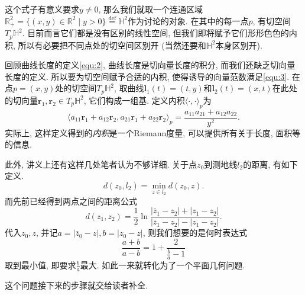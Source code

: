 \documentclass[./main.tex]{subfiles}
\begin{document}
这个式子有意义要求\(y\ne0\), 那么我们就取一个连通区域\(\mathbb{R}^2_+=\{(x,y)\in\mathbb{R}^2\mid y>0\}\overset{\text{def}}{=}\mathbb{H}^2\)作为讨论的对象. 在其中的每一点\(p\), 有切空间\(T_p\mathbb{H}^2\). 目前而言它们都是没有区别的线性空间, 但我们即将赋予它们形形色色的内积, 所以有必要把不同点处的切空间区别开 (当然还要和\(\mathbb{H}^2\)本身区别开).

回顾曲线长度的定义\eqref{equ:2}, 曲线长度是切向量长度的积分, 而我们还缺乏切向量长度的定义. 所以要为切空间赋予合适的内积, 使得诱导的向量范数满足\eqref{equ:3}. 在点\(p=(x,y)\)处的切空间\(T_p\mathbb{H}^2\), 取曲线\(\mathbf{l}_1(t)=(t,y)\)和\(\mathbf{l}_2(t)=(x,t)\)在此处的切向量\(\mathbf{r}_1,\mathbf{r}_2\in T_p\mathbb{H}^2\), 它们构成一组基. 定义内积\(\langle\cdot,\cdot\rangle_p\)为
\[
    \langle a_{11}\mathbf{r}_1+a_{12}\mathbf{r}_2,a_{21}\mathbf{r}_1+a_{22}\mathbf{r}_2\rangle_p=\frac{a_{11}a_{21}+a_{12}a_{22}}{y^2}.
\]
实际上, 这样定义得到的\textit{内积}是一个Riemann度量, 可以提供所有关于长度, 面积等的信息.

此外, 讲义上还有这样几处笔者认为不够详细. 关于点\(z_0\)到测地线\(l_2\)的距离, 有如下定义.
\[
    d(z_0,l_2)=\min_{z\in l_2}d(z_0,z).
\]
而先前已经得到两点之间的距离公式
\[
    d(z_1,z_2)=\frac{1}{2}\ln \frac{|\bar z_1-z_2|+|z_1-z_2|}{|\bar z_1-z_2|-|z_1-z_2|}.
\]
代入\(z_0,z\), 并记\(a=|\bar z_0-z|,b=|z_0-z|\), 则我们想要的是何时表达式
\[
    \frac{a+b}{a-b}=1+\frac{2}{\frac{b}{a}-1}
\]
取到最小值, 即要求\(\frac{b}{a}\)最大. 如此一来就转化为了一个平面几何问题.
\begin{figure}[!ht]
    \centering
\end{figure}

这个问题接下来的步骤就交给读者补全.
\end{document}

